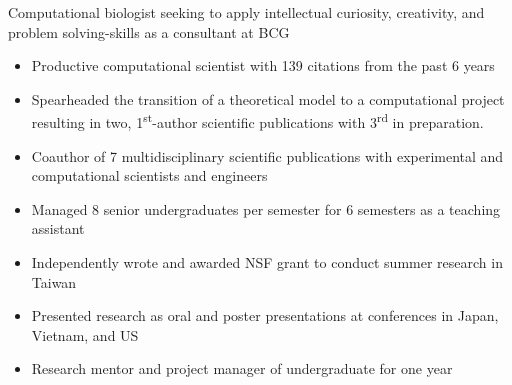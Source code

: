 

\begin{cventries}
\vspace{-4.0mm}

  \cventry
    {} %
    {} %
    {} %
    {} %
    {
      \begin{cvitems} %
        \item {Computational biologist seeking to apply intellectual curiosity, creativity, and problem solving-skills as a consultant at BCG}
        \begin{itemize}
        	\item Productive computational scientist with 139 citations from the past 6 years
        	\item Spearheaded the transition of a theoretical model to a computational project resulting in two, 1\textsuperscript{st}-author scientific publications with 3\textsuperscript{rd} in preparation.
        	\item Coauthor of 7 multidisciplinary scientific publications with experimental and computational scientists and engineers
        	\item Managed 8 senior undergraduates per semester for 6 semesters as a teaching assistant
        	\item Independently wrote and awarded NSF grant to conduct summer research in Taiwan
       	 	\item Presented research as oral and poster presentations at conferences in Japan, Vietnam, and US  
         	\item Research mentor and project manager of undergraduate for one year
        \end{itemize}
      \end{cvitems}
    }
\vspace{-4.0mm}
\end{cventries}
